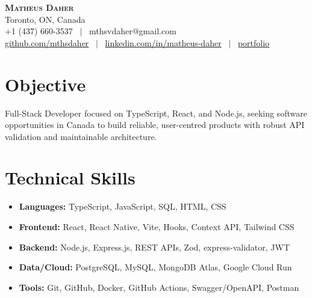 \documentclass[letterpaper,12pt]{fed-res}
\begin{document}
\begin{center}
    \textbf{\Huge \scshape Matheus Daher} \\ \vspace{2pt}
    Toronto, ON, Canada \\ \vspace{2pt}
    +1 (437) 660-3537 \ $|$ \ mthsvdaher@gmail.com \\ \vspace{2pt}
    \href{https://github.com/mthsdaher}{github.com/mthsdaher} \ $|$ \
    \href{https://www.linkedin.com/in/matheus-daher/}{linkedin.com/in/matheus-daher} \ $|$ \
    \href{https://portfolio-git-main-matheus-projects-cba512cb.vercel.app/}{portfolio}
\end{center}

\section{Objective}
Full-Stack Developer focused on TypeScript, React, and Node.js, seeking software opportunities in Canada to build reliable, user-centred products with robust API validation and maintainable architecture.

\section{Technical Skills}
\begin{itemize}[leftmargin=0.15in, label={}]
  \item \textbf{Languages:} TypeScript, JavaScript, SQL, HTML, CSS
  \item \textbf{Frontend:} React, React Native, Vite, Hooks, Context API, Tailwind CSS
  \item \textbf{Backend:} Node.js, Express.js, REST APIs, Zod, express-validator, JWT
  \item \textbf{Data/Cloud:} PostgreSQL, MySQL, MongoDB Atlas, Google Cloud Run
  \item \textbf{Tools:} Git, GitHub, Docker, GitHub Actions, Swagger/OpenAPI, Postman
\end{itemize}
\end{document}
